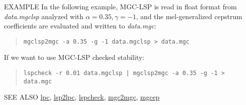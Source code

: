 \begin{qsection}{EXAMPLE}
In the following example, MGC-LSP is read in float format from {\em
  data.mgclsp} analyzed with $\alpha = 0.35, \gamma = -1$, and the
mel-generalized cepstrum coefficients are evaluated and written to {\em
  data.mgc}:
\begin{quote}
\verb!mgclsp2mgc -a 0.35 -g -1 data.mgclsp > data.mgc!
\end{quote}
If we want to use MGC-LSP checked stability:
\begin{quote}
\verb!lspcheck -r 0.01 data.mgclsp | mgclsp2mgc -a 0.35 -g -1 > data.mgc!
\end{quote}
\end{qsection}

\begin{qsection}{SEE ALSO}
\hyperlink{lpc}{lpc},
\hyperlink{lsp2lpc}{lsp2lpc},
\hyperlink{lspcheck}{lspcheck},
\hyperlink{mgc2mgc}{mgc2mgc},
\hyperlink{mgcep}{mgcep}
\end{qsection}
